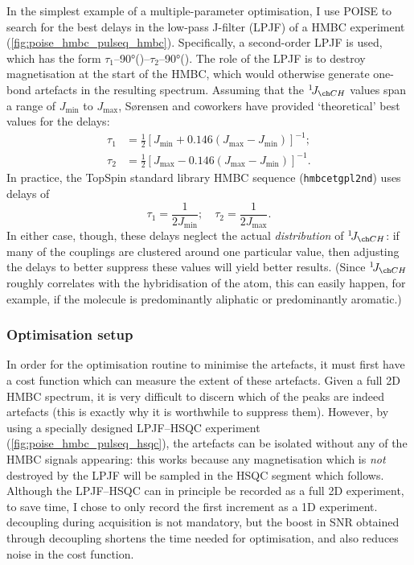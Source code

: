 In the simplest example of a multiple-parameter optimisation, I use POISE to search for the best delays in the low-pass J-filter (LPJF) of a HMBC experiment (\cref{fig:poise_hmbc_pulseq_hmbc}).
Specifically, a second-order LPJF is used, which has the form $\tau_1$--\ang{90}(\carbon{})--$\tau_2$--\ang{90}(\carbon{}).
The role of the LPJF is to destroy  magnetisation at the start of the HMBC, which would otherwise generate one-bond artefacts in the resulting spectrum.
Assuming that the $\oneJ{CH}$ values span a range of $J_\text{min}$ to $J_\text{max}$, S{\o}rensen and coworkers have provided `theoretical' best values for the delays:\autocite{Nielsen1986JMR,Meissner2000MRC}
\begin{align}
    \tau_1 &= \frac{1}{2} [J_\text{min} + 0.146(J_\text{max} - J_\text{min})]^{-1}; \label{eq:hmbc_lpjf_theoretical_min} \\
    \tau_2 &= \frac{1}{2} [J_\text{max} - 0.146(J_\text{max} - J_\text{min})]^{-1}. \label{eq:hmbc_lpjf_theoretical_max}
\end{align}
In practice, the TopSpin standard library HMBC sequence (\texttt{hmbcetgpl2nd}) uses delays of
\begin{equation}
    \tau_1 = \frac{1}{2J_\text{min}}; \quad \tau_2 = \frac{1}{2J_\text{max}}. \label{eq:hmbc_lpjf_bruker}
\end{equation}
In either case, though, these delays neglect the actual \textit{distribution} of $\oneJ{CH}$: if many of the couplings are clustered around one particular value, then adjusting the delays to better suppress these values will yield better results.
(Since $\oneJ{CH}$ roughly correlates with the hybridisation of the \carbon{} atom,\autocite{Krivdin2018PNMRS} this can easily happen, for example, if the molecule is predominantly aliphatic or predominantly aromatic.)


\subsubsection{Optimisation setup}

In order for the optimisation routine to minimise the artefacts, it must first have a cost function which can measure the extent of these artefacts.
Given a full 2D HMBC spectrum, it is very difficult to discern which of the peaks are indeed artefacts (this is exactly why it is worthwhile to suppress them).
However, by using a specially designed LPJF--HSQC experiment (\cref{fig:poise_hmbc_pulseq_hsqc}), the artefacts can be isolated without any of the HMBC signals appearing:
this works because any  magnetisation which is \textit{not} destroyed by the LPJF will be sampled in the HSQC segment which follows.
Although the LPJF--HSQC can in principle be recorded as a full 2D experiment, to save time, I chose to only record the first increment as a 1D experiment.
\carbon{} decoupling during acquisition is not mandatory, but the boost in SNR obtained through decoupling shortens the time needed for optimisation, and also reduces noise in the cost function.

